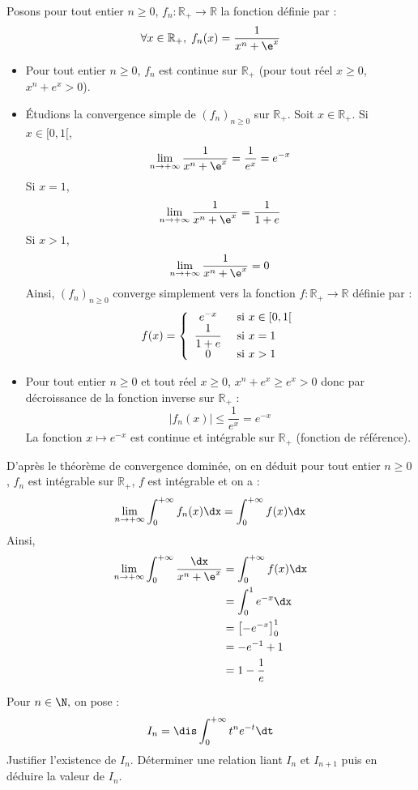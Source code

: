 \documentclass[a4paper,10pt]{report}
\begin{document}
 \corr Posons pour tout entier $n \geq 0$, $f_n : \mathbb{R}_+ \rightarrow \mathbb{R}$ la fonction définie par :
 $$ \forall x \in \mathbb{R}_+, \; f_n(x) = \frac{1}{x^{n} + \e^{x}}$$
 
 \begin{itemize}
 \item Pour tout entier $n \geq 0$, $f_n$ est continue sur $\mathbb{R}_+$ (pour tout réel $x \geq 0$, $x^n+e^x>0$).
 \item Étudions la convergence simple de $(f_n)_{n \geq 0}$ sur $\mathbb{R}_+$. Soit $x \in \mathbb{R}_+$. Si $x \in [0,1[$,
 $$ \lim_{n \rightarrow + \infty} \frac{1}{x^{n} + \e^{x}} = \dfrac{1}{e^x} = e^{-x}$$
 Si $x=1$,
 $$ \lim_{n \rightarrow + \infty} \frac{1}{x^{n} + \e^{x}} = \dfrac{1}{1+e}$$
 Si $x>1$,
 $$  \lim_{n \rightarrow + \infty} \frac{1}{x^{n} + \e^{x}} = 0$$
 Ainsi, $(f_n)_{n \geq 0}$ converge simplement vers la fonction $f: \mathbb{R}_+ \rightarrow \mathbb{R}$ définie par :
 $$ f(x) = \left\lbrace \begin{array}{cl}
 e^{-x} & \hbox{ si } x \in [0,1[ \\
  \dfrac{1}{1+e} & \hbox{ si } x = 1 \\
  0 & \hbox{ si } x>1
 \end{array}\right.$$
 \item Pour tout entier $n \geq 0$ et tout réel $x \geq 0$, $x^n+e^x \geq e^x>0$ donc par décroissance de la fonction inverse sur $\mathbb{R}_+$ :
 $$ \vert f_n(x) \vert \leq \dfrac{1}{e^x}=e^{-x}$$
La fonction $x \mapsto e^{-x}$ est continue et intégrable sur $\mathbb{R}_+$ (fonction de référence).
 \end{itemize}
D'après le théorème de convergence dominée, on en déduit pour tout entier $n \geq 0$, $f_n$ est intégrable sur $\mathbb{R}_+$, $f$ est intégrable et on a :
$$ \lim_{n \rightarrow + \infty} \int_0^{+ \infty} f_n(x) \dx = \int_0^{+ \infty} f(x) \dx$$
Ainsi,
\begin{align*}
\lim_{n \rightarrow + \infty} \int_{0}^{ + \infty} \frac{\dx}{x^{n} + \e^{x}} & = \int_0^{+ \infty} f(x) \dx \\
& = \int_0^1 e^{-x} \dx \\
& = \left[ -e^{-x} \right]_0^1 \\
& = -e^{-1}+ 1 \\
& = 1 - \dfrac{1}{e}
\end{align*}

\begin{Exa} Pour $n\in\N,$ on pose :
$$I_n=\dis\int_0^{+\infty} t^ne^{-t} \dt$$
Justifier l'existence de $I_n$. D\'eterminer une relation liant $I_n$ et $I_{n+1}$ puis en d\'eduire la valeur de $I_n.$
\end{Exa} 
\end{document}

